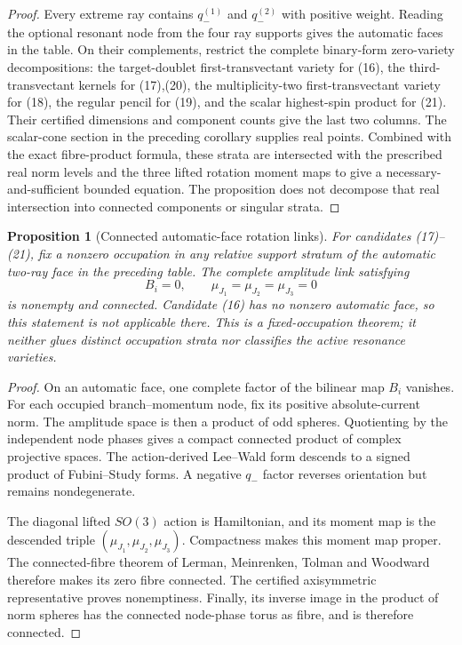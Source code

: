 \documentclass[11pt]{article}
\newtheorem{proposition}[theorem]{Proposition}
\theoremstyle{definition}
\theoremstyle{remark}
\begin{document}
\begin{proof}
Every extreme ray contains $q_-^{(1)}$ and $q_-^{(2)}$ with positive
weight.  Reading the optional resonant node from the four ray supports gives
the automatic faces in the table.  On their complements, restrict the
complete binary-form zero-variety decompositions: the target-doublet
first-transvectant variety for (16), the third-transvectant kernels for
(17),(20), the multiplicity-two first-transvectant variety for (18), the
regular pencil for (19), and the scalar highest-spin product for (21).
Their certified dimensions and component counts give the last two columns.
The scalar-cone section in the preceding corollary supplies real points.
Combined with the exact fibre-product formula, these strata are intersected
with the prescribed real norm levels and the three lifted rotation moment
maps to give a necessary-and-sufficient bounded equation.  The proposition
does not decompose that real intersection into connected components or
singular strata.
\end{proof}

\begin{proposition}[Connected automatic-face rotation links]
For candidates (17)--(21), fix a nonzero occupation in any relative support
stratum of the automatic two-ray face in the preceding table.  The complete
amplitude link satisfying
\[
 B_i=0,
 \qquad
 \mu_{J_1}=\mu_{J_2}=\mu_{J_3}=0
\]
is nonempty and connected.  Candidate (16) has no nonzero automatic face, so
this statement is not applicable there.  This is a fixed-occupation theorem;
it neither glues distinct occupation strata nor classifies the active
resonance varieties.
\end{proposition}

\begin{proof}
On an automatic face, one complete factor of the bilinear map \(B_i\)
vanishes.  For each occupied branch--momentum node, fix its positive
absolute-current norm.  The amplitude space is then a product of odd
spheres.  Quotienting by the independent node phases gives a compact
connected product of complex projective spaces.  The action-derived
Lee--Wald form descends to a signed product of Fubini--Study forms.  A
negative \(q_-\) factor reverses orientation but remains nondegenerate.

The diagonal lifted \(SO(3)\) action is Hamiltonian, and its moment map is
the descended triple \((\mu_{J_1},\mu_{J_2},\mu_{J_3})\).  Compactness makes
this moment map proper.  The connected-fibre theorem of Lerman,
Meinrenken, Tolman and Woodward~\cite{LMTW} therefore makes its zero fibre
connected.  The certified axisymmetric representative proves nonemptiness.
Finally, its inverse image in the product of norm spheres has the connected
node-phase torus as fibre, and is therefore connected.
\end{proof}
\end{document}
